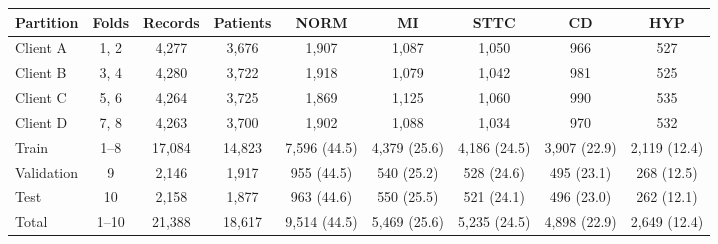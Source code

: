 \begin{tabular}{@{}lcccccccc@{}}
\toprule
Partition & Folds & Records & Patients & NORM & MI & STTC & CD & HYP \\
\midrule
Client A & 1, 2 & 4{,}277 & 3{,}676 & 1{,}907 & 1{,}087 & 1{,}050 & 966 & 527 \\
Client B & 3, 4 & 4{,}280 & 3{,}722 & 1{,}918 & 1{,}079 & 1{,}042 & 981 & 525 \\
Client C & 5, 6 & 4{,}264 & 3{,}725 & 1{,}869 & 1{,}125 & 1{,}060 & 990 & 535 \\
Client D & 7, 8 & 4{,}263 & 3{,}700 & 1{,}902 & 1{,}088 & 1{,}034 & 970 & 532 \\
\midrule
Train & 1--8 & 17{,}084 & 14{,}823 & 7{,}596 (44.5) & 4{,}379 (25.6) & 4{,}186 (24.5) & 3{,}907 (22.9) & 2{,}119 (12.4) \\
Validation & 9 & 2{,}146 & 1{,}917 & 955 (44.5) & 540 (25.2) & 528 (24.6) & 495 (23.1) & 268 (12.5) \\
Test & 10 & 2{,}158 & 1{,}877 & 963 (44.6) & 550 (25.5) & 521 (24.1) & 496 (23.0) & 262 (12.1) \\
\midrule
Total & 1--10 & 21{,}388 & 18{,}617 & 9{,}514 (44.5) & 5{,}469 (25.6) & 5{,}235 (24.5) & 4{,}898 (22.9) & 2{,}649 (12.4) \\
\bottomrule
\end{tabular}
